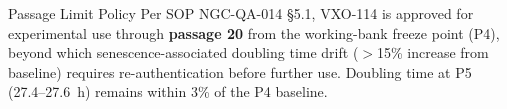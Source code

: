 \begin{recordbox}{Passage Limit Policy}
  Per SOP NGC-QA-014 \S 5.1, VXO-114 is approved for experimental use through \textbf{passage
  20} from the working-bank freeze point (P4), beyond which senescence-associated doubling
  time drift ($>$15\% increase from baseline) requires re-authentication before further use.
  Doubling time at P5 (27.4--27.6~h) remains within 3\% of the P4 baseline.
\end{recordbox}
